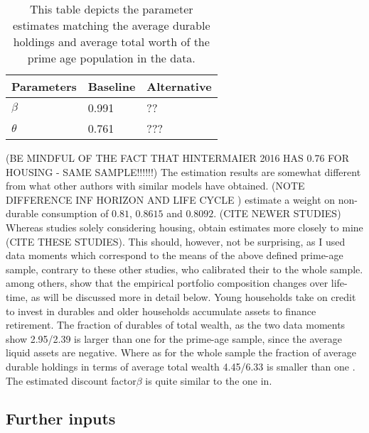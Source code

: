\documentclass[a4paper,12pt]{article}
\begin{document}
\begin{table}[!htbp]
\centering
\caption{This table depicts the parameter estimates matching the average durable holdings and average total worth of the prime age population in the data.}
\label{estimates}
\begin{tabular}{llll}
\hline
\multicolumn{2}{l}{Parameters} & Baseline & Alternative \\ \hline
\multicolumn{2}{l}{$\beta$}             & 0.991    & ??          \\
\multicolumn{2}{l}{$\theta$}            & 0.761    & ???        
\end{tabular}
\end{table}


(BE MINDFUL OF THE FACT THAT HINTERMAIER 2016 HAS 0.76 FOR HOUSING - SAME SAMPLE!!!!!!) 
The estimation results are somewhat different from what other authors with similar models have obtained. (NOTE DIFFERENCE INF HORIZON AND LIFE CYCLE ) \cite{FV&K2011} estimate a weight on non-durable consumption of $0.81$, \cite{yang2009} $0.8615$ and \cite{hintermaier2010} $0.8092$. (CITE NEWER STUDIES) Whereas studies solely considering housing, obtain estimates more closely to mine (CITE THESE STUDIES). This should, however, not be surprising, as I used data moments which correspond to the means of the above defined prime-age sample, contrary to these other studies, who calibrated their to the whole sample. \cite{diaz2010} among others, show that the empirical portfolio composition changes over life-time, as will be discussed more in detail below. Young households take on credit to invest in durables and older households accumulate assets to finance retirement. The fraction of durables of total wealth, as the two data moments show 2.95/2.39 is larger than one for the prime-age sample, since the average liquid assets are negative. Where as for the whole sample the fraction of average durable holdings in terms of average total wealth 4.45/6.33 is smaller than one \citep{hintermaier2010}. The estimated  discount factor$\beta$ is quite similar to the one in\cite{hintermaier2011}. 

\subsection{Further inputs}
\end{document}
